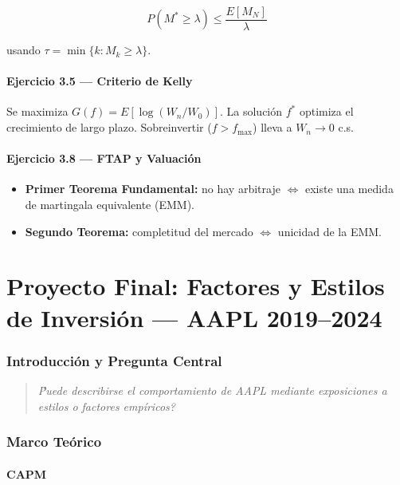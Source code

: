 \documentclass[12pt,letterpaper]{article}
\begin{document}
\[
  P\!\left(M^* \geq \lambda\right) \leq \frac{E[M_N]}{\lambda}
\]

usando $\tau = \min\{k : M_k \geq \lambda\}$.

\subsection*{Ejercicio 3.5 --- Criterio de Kelly}

Se maximiza $G(f) = E[\log(W_n/W_0)]$. La soluci\'on $f^*$ optimiza el crecimiento
de largo plazo. Sobreinvertir ($f > f_{\max}$) lleva a $W_n \to 0$ c.s.

\subsection*{Ejercicio 3.8 --- FTAP y Valuaci\'on}

\begin{itemize}
  \item \textbf{Primer Teorema Fundamental:} no hay arbitraje $\iff$ existe una
    medida de martingala equivalente (EMM).
  \item \textbf{Segundo Teorema:} completitud del mercado $\iff$ unicidad de la
    EMM.
\end{itemize}

\part{Proyecto Final: Factores y Estilos de Inversi\'on --- AAPL 2019--2024}

\section{Introducci\'on y Pregunta Central}

\begin{quote}
  \textit{\'Puede describirse el comportamiento de AAPL mediante exposiciones a
  estilos o factores emp\'iricos?}
\end{quote}

\section{Marco Te\'orico}

\subsection{CAPM}
\end{document}
